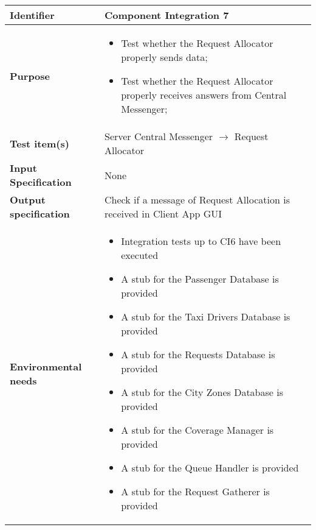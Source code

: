 \begin{center}
\begin{tabular}{lp{}}
\toprule
\textbf{Identifier}		&	Component Integration 7\\
\midrule
\textbf{Purpose}		&	\begin{itemize}
					\item Test whether the Request Allocator properly sends data;
					\item Test whether the Request Allocator properly receives answers from Central Messenger;
					\end{itemize}	\\
\textbf{Test item(s)}	&	Server Central Messenger $\rightarrow$ Request Allocator\\
\textbf{Input Specification}	&	None\\
\textbf{Output specification}	&	Check if a message of Request Allocation is received in Client App GUI\\
\textbf{Environmental needs}	&	\begin{itemize}
							\item Integration tests up to CI6 have been executed
							\item A stub for the Passenger Database is provided
							\item A stub for the Taxi Drivers Database is provided
							\item A stub for the Requests Database is provided
							\item A stub for the City Zones Database is provided
							\item A stub for the Coverage Manager is provided
							\item A stub for the Queue Handler is provided
							\item A stub for the Request Gatherer is provided
							\end{itemize}	\\
\bottomrule
\end{tabular}
\end{center}




